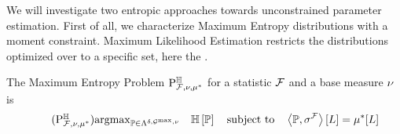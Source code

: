 






 \label{sec:parameterEstimation} %

We will investigate two entropic approaches towards unconstrained parameter estimation.
First of all, we characterize Maximum Entropy distributions with a moment constraint.
Maximum Likelihood Estimation restricts the distributions optimized over to a specific set, here the \HybridLogicNetworks{}.



The Maximum Entropy Problem $\mathrm{P}^{\mathbb{H}}_{\mathcal{F},\nu,\mu^*}$ for a statistic $\mathcal{F}$ and a base measure $\nu$ is %
\begin{align}
    \label{prob:maxEntropyHLN}\tag{$\probtagtypeinst{\entropysymbol}{\mlnstat,\basemeasure,\genmean}$}
    \argmax_{\probtensor\in\bmrealprobof{\basemeasure}} \quad \sentropyof{\probtensor}
    \quad \text{subject to} \quad
    \contractionof{\probtensor,\sencmlnstat}{\selvariable}
    =  \genmeanwith
\end{align}

